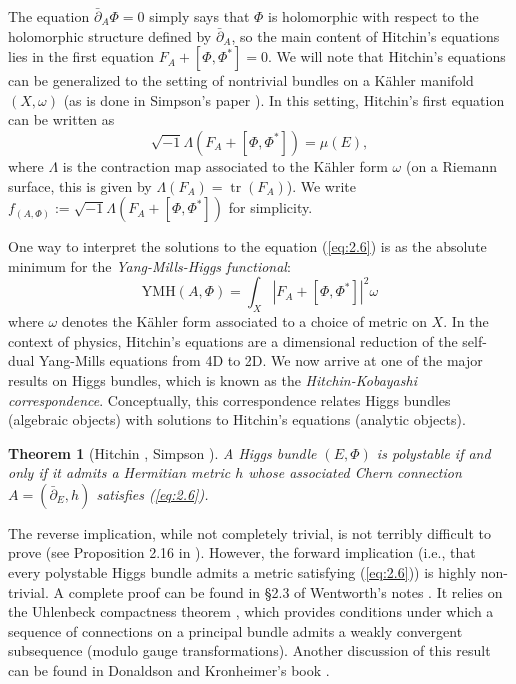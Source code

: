\documentclass[10pt]{amsart}
\numberwithin{equation}{section}
\newcommand{\YMH}{\mathrm{YMH}}
\DeclareMathOperator{\tr}{tr}
\theoremstyle{plain}
\newtheorem{thm}{Theorem}[section]
\theoremstyle{definition}
\theoremstyle{remark}
\begin{document}
The equation $\bar{\partial}_A \Phi = 0$ simply says that $\Phi$ is holomorphic with respect to the holomorphic structure defined by $\bar{\partial}_A$, so the main content of Hitchin's equations lies in the first equation $F_A + [\Phi, \Phi^*] = 0$. We will note that Hitchin's equations can be generalized to the setting of nontrivial bundles on a K\"ahler manifold $(X, \omega)$ (as is done in Simpson's paper \cite{simpson92}). In this setting, Hitchin's first equation can be written as 
\begin{equation}\label{eq:2.6}
\sqrt{-1}\Lambda(F_A + [\Phi, \Phi^*]) = \mu(E),
\end{equation}
where $\Lambda$ is the contraction map associated to the K\"ahler form $\omega$ (on a Riemann surface, this is given by $\Lambda(F_A) = \tr(F_A )$). We write $f_{(A, \Phi)} := \sqrt{-1}\Lambda(F_A + [\Phi, \Phi^*])$ for simplicity. 

One way to interpret the solutions to the equation (\ref{eq:2.6}) is as the absolute minimum for the \emph{Yang-Mills-Higgs functional}:
\begin{equation} 
    \YMH(A, \Phi) = \int_X \left|F_A + [\Phi, \Phi^*] \right|^2 \omega
\end{equation}
where $\omega$ denotes the K\"ahler form associated to a choice of metric on $X$. In the context of physics, Hitchin's equations are a dimensional reduction of the self-dual Yang-Mills equations from 4D to 2D. We now arrive at one of the major results on Higgs bundles, which is known as the \emph{Hitchin-Kobayashi correspondence}. Conceptually, this correspondence relates Higgs bundles (algebraic objects) with solutions to Hitchin's equations (analytic objects).
\begin{thm}[Hitchin \cite{hitchin1987A}, Simpson \cite{simpson88}]
    A Higgs bundle $(E, \Phi)$ is polystable if and only if it admits a Hermitian metric $h$ whose associated Chern connection $A = (\bar{\partial}_E, h)$ satisfies (\ref{eq:2.6}). 
\end{thm}
The reverse implication, while not completely trivial, is not terribly difficult to prove (see Proposition 2.16 in \cite{wentworth2015}). However, the forward implication (i.e., that every polystable Higgs bundle admits a metric satisfying (\ref{eq:2.6})) is highly non-trivial. A complete proof can be found in \S2.3 of Wentworth's notes \cite{wentworth2015}. It relies on the Uhlenbeck compactness theorem \cite{uhlenbeck1982}, which provides conditions under which a sequence of connections on a principal bundle admits a weakly convergent subsequence (modulo gauge transformations). Another discussion of this result can be found in Donaldson and Kronheimer's book \cite{DK1990}.
\end{document}
